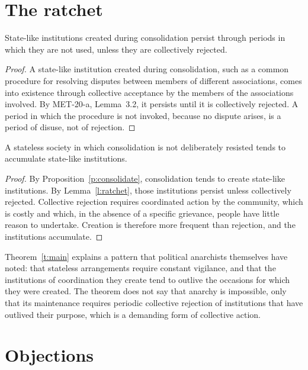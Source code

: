 \documentclass{situationist-preprint}
\begin{document}
\section{The ratchet}

\begin{lemma}\label{l:ratchet}
State-like institutions created during consolidation persist through periods in which they are not used, unless they are collectively rejected.
\end{lemma}

\begin{proof}
A state-like institution created during consolidation, such as a common procedure for resolving disputes between members of different associations, comes into existence through collective acceptance by the members of the associations involved. By MET-20-a, Lemma~3.2, it persists until it is collectively rejected. A period in which the procedure is not invoked, because no dispute arises, is a period of disuse, not of rejection.
\end{proof}

\begin{theorem}\label{t:main}
A stateless society in which consolidation is not deliberately resisted tends to accumulate state-like institutions.
\end{theorem}

\begin{proof}
By Proposition~\ref{p:consolidate}, consolidation tends to create state-like institutions. By Lemma~\ref{l:ratchet}, those institutions persist unless collectively rejected. Collective rejection requires coordinated action by the community, which is costly and which, in the absence of a specific grievance, people have little reason to undertake. Creation is therefore more frequent than rejection, and the institutions accumulate.
\end{proof}

Theorem~\ref{t:main} explains a pattern that political anarchists themselves have noted: that stateless arrangements require constant vigilance, and that the institutions of coordination they create tend to outlive the occasions for which they were created. The theorem does not say that anarchy is impossible, only that its maintenance requires periodic collective rejection of institutions that have outlived their purpose, which is a demanding form of collective action.

\section{Objections}
\end{document}

